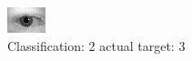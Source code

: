 \begin{figure}[h!]
\begin{center}
\includegraphics[width=0.60\columnwidth]{figures/ID534_class_2_target_3.png}
\end{center}
\caption{ Classification: 2 actual target: 3}
\label{fig:ID534_class_2_target_3}
\end{figure}
